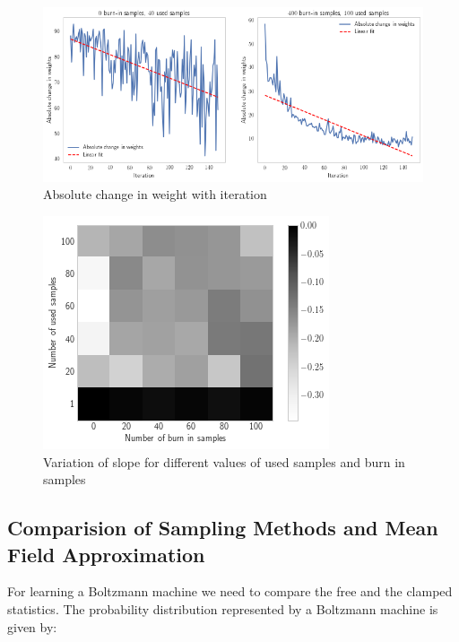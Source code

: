 \documentclass{article}
\begin{document}
\begin{figure}[ht]
  \centering
  \includegraphics[width=\textwidth]{sampling}
  \caption{Absolute change in weight with iteration}
  \label{fig:sampling}
\end{figure}

\begin{figure}[ht]
  \centering
  \includegraphics[width=\textwidth]{sampling_grid}
  \caption{Variation of slope for different values of used samples and burn in 
  samples}
  \label{fig:sampling_grid}
\end{figure}

\subsection{Comparision of Sampling Methods and Mean Field Approximation}
For learning a Boltzmann machine we need to compare the free and the clamped
statistics. The probability distribution represented by a Boltzmann machine
is given by:
\end{document}
